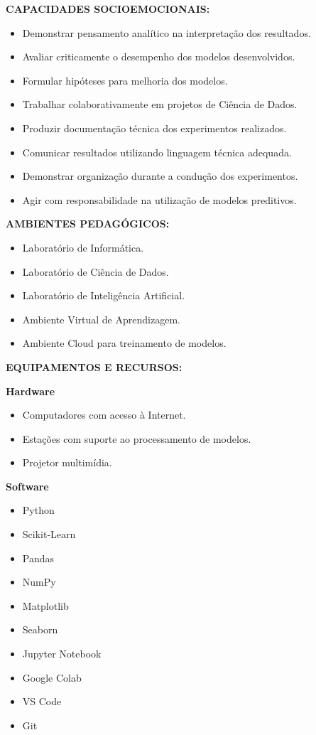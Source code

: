 \textbf{CAPACIDADES SOCIOEMOCIONAIS:}

\begin{itemize}
\item Demonstrar pensamento analítico na interpretação dos resultados.
\item Avaliar criticamente o desempenho dos modelos desenvolvidos.
\item Formular hipóteses para melhoria dos modelos.
\item Trabalhar colaborativamente em projetos de Ciência de Dados.
\item Produzir documentação técnica dos experimentos realizados.
\item Comunicar resultados utilizando linguagem técnica adequada.
\item Demonstrar organização durante a condução dos experimentos.
\item Agir com responsabilidade na utilização de modelos preditivos.
\end{itemize}

\textbf{AMBIENTES PEDAGÓGICOS:}

\begin{itemize}
\item Laboratório de Informática.
\item Laboratório de Ciência de Dados.
\item Laboratório de Inteligência Artificial.
\item Ambiente Virtual de Aprendizagem.
\item Ambiente Cloud para treinamento de modelos.
\end{itemize}

\textbf{EQUIPAMENTOS E RECURSOS:}

\textbf{Hardware}

\begin{itemize}
\item Computadores com acesso à Internet.
\item Estações com suporte ao processamento de modelos.
\item Projetor multimídia.
\end{itemize}

\textbf{Software}

\begin{itemize}
\item Python
\item Scikit-Learn
\item Pandas
\item NumPy
\item Matplotlib
\item Seaborn
\item Jupyter Notebook
\item Google Colab
\item VS Code
\item Git
\end{itemize}
